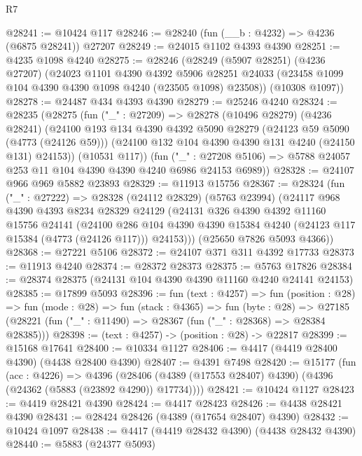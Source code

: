 \begin{lexlean}{R7}
\begin{coremodule}
@28241 := @10424 @117
@28246 := @28240 (fun (__b : @4232) => @4236 (@6875 @28241)) @27207
@28249 := @24015 @1102 @4393 @4390
@28251 := @4235 @1098 @4240
@28275 := @28246
    (@28249
      (@5907 @28251)
      (@4236 @27207)
      (@24023
        @1101
        @4390
        @4392
        @5906
        @28251
        @24033
        (@23458 @1099 @104 @4390 @4390 @1098 @4240 (@23505 @1098) @23508))
      (@10308 @1097))
@28278 := @24487 @434 @4393 @4390
@28279 := @25246 @4240
@28324 := @28235
    (@28275
      (fun ("_" : @27209) =>
      @28278
        (@10496 @28279)
        (@4236 @28241)
        (@24100
          @193
          @134
          @4390
          @4392
          @5090
          @28279
          (@24123 @59 @5090 (@4773 (@24126 @59)))
          (@24100 @132 @104 @4390 @4390 @131 @4240 (@24150 @131) @24153))
        (@10531 @117))
      (fun ("_" : @27208 @5106) => @5788 @24057 @253 @11 @104 @4390 @4390 @4240 @6986 @24153 @6989))
@28328 := @24107 @966 @969 @5882 @23893
@28329 := @11913 @15756
@28367 := @28324
    (fun ("_" : @27222) =>
    @28328
      (@24112 @28329)
      (@5763 @23994)
      (@24117
        @968
        @4390
        @4393
        @8234
        @28329
        @24129
        (@24131
          @326
          @4390
          @4392
          @11160
          @15756
          @24141
          (@24100
            @286
            @104
            @4390
            @4390
            @15384
            @4240
            (@24123 @117 @15384 (@4773 (@24126 @117)))
            @24153)))
      (@25650 @7826 @5093 @4366))
@28368 := @27221 @5106
@28372 := @24107 @371 @311 @4392 @17733
@28373 := @11913 @4240
@28374 := @28372 @28373
@28375 := @5763 @17826
@28384 := @28374 @28375 (@24131 @104 @4390 @4390 @11160 @4240 @24141 @24153)
@28385 := @17899 @5093
@28396 := fun (text : @4257) =>
  fun (position : @28) =>
  fun (mode : @28) =>
  fun (stack : @4365) =>
  fun (byte : @28) =>
  @27185 (@28221 (fun ("_" : @11490) => @28367 (fun ("_" : @28368) => @28384 @28385)))
@28398 := (text : @4257) -> (position : @28) -> @22817
@28399 := @15168 @17641
@28400 := @10334 @1127
@28406 := @4417 (@4419 @28400 @4390) (@4438 @28400 @4390)
@28407 := @4391 @7498
@28420 := @15177
    (fun (acc : @4226) =>
    @4396 (@28406 (@4389 (@17553 @28407) @4390) (@4396 (@24362 (@5883 (@23892 @4290)) @17734))))
@28421 := @10424 @1127
@28423 := @4419 @28421 @4390
@28424 := @4417 @28423
@28426 := @4438 @28421 @4390
@28431 := @28424 @28426 (@4389 (@17654 @28407) @4390)
@28432 := @10424 @1097
@28438 := @4417 (@4419 @28432 @4390) (@4438 @28432 @4390)
@28440 := @5883 (@24377 @5093)

\end{coremodule}
\end{lexlean}
